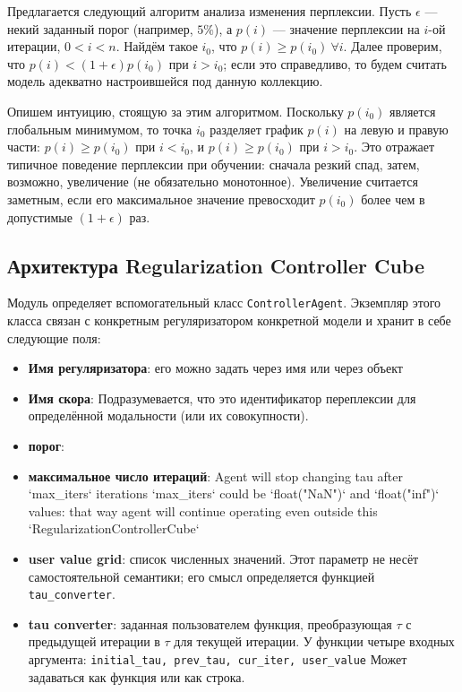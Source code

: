 Предлагается следующий алгоритм анализа изменения перплексии. Пусть $\epsilon$ --- некий заданный порог (например, $5\%$), а  $p(i)$ --- значение перплексии на $i$-ой итерации, $0 < i < n$. Найдём такое $i_0$, что $p(i) \geq p(i_0)~\forall i$. Далее проверим, что $p(i) < (1 + \epsilon) p(i_0)$ при $i > i_0$; если это справедливо, то будем считать модель адекватно настроившейся под данную коллекцию.  

Опишем интуицию, стоящую за этим алгоритмом. Поскольку $p(i_0)$ является глобальным минимумом, то точка $i_0$ разделяет график $p(i)$ на левую и правую части: $p(i) \geq p(i_0)$ при $i < i_0$, и $p(i) \geq p(i_0)$ при $i > i_0$. Это отражает типичное поведение перплексии при обучении: сначала резкий спад, затем, возможно, увеличение (не обязательно монотонное). Увеличение считается заметным, если его максимальное значение превосходит $p(i_0)$ более чем в допустимые $(1 + \epsilon)$ раз.

\subsection{Архитектура Regularization Controller Cube}

Модуль определяет вспомогательный класс
\texttt{ControllerAgent}. Экземпляр этого класса связан с конкретным регуляризатором конкретной модели и хранит в себе следующие поля:

\begin{itemize}
    \item \textbf{Имя регуляризатора}: его можно задать через имя или через объект
\item \textbf{Имя скора}: Подразумевается, что это идентификатор переплексии для определённой модальности (или их совокупности). 
\item \textbf{порог}: 
\item \textbf{максимальное число итераций}:     Agent will stop changing tau after `max\_iters` iterations
    `max\_iters` could be `float("NaN")` and `float("inf")` values:
    that way agent will continue operating even outside this `RegularizationControllerCube`

\item \textbf{user value grid}: список численных значений. Этот параметр не несёт самостоятельной семантики; его смысл определяется функцией \texttt{tau\_converter}.
\item \textbf{tau converter}: заданная пользователем функция, преобразующая $\tau$ с предыдущей итерации в $\tau$ для текущей итерации. У функции четыре входных аргумента: 
        \texttt{initial\_tau, prev\_tau, cur\_iter, user\_value}
Может задаваться как функция или как строка.
\end{itemize}

